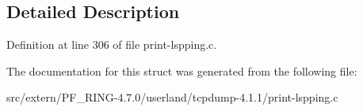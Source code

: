 \subsection{Detailed Description}


Definition at line 306 of file print-\/lspping.c.



The documentation for this struct was generated from the following file:\begin{DoxyCompactItemize}
\item 
src/extern/PF\_\-RING-\/4.7.0/userland/tcpdump-\/4.1.1/print-\/lspping.c\end{DoxyCompactItemize}
